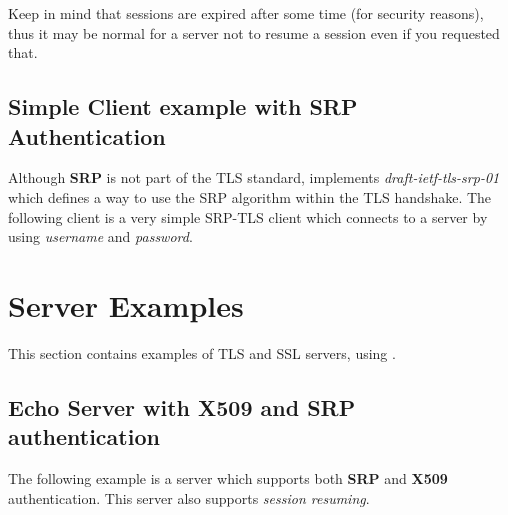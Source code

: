 \documentclass{book}
\begin{document}
\par
Keep in mind that sessions are expired after some time (for security reasons), thus
it may be normal for a server not to resume a session even if you requested that.



\subsection{Simple Client example with SRP Authentication}
Although {\bf SRP} is not part of the TLS standard, \gnutls implements
{\it draft-ietf-tls-srp-01} which defines a way to use the SRP algorithm
within the TLS handshake. The following client
is a very simple SRP-TLS client which connects to a server by using 
{\it username} and {\it password}.



\section{Server Examples}
This section contains examples of TLS and SSL servers, using \gnutls.

\subsection{Echo Server with X509 and SRP authentication}
The following example is a server which supports both {\bf SRP} and {\bf X509} authentication.
This server also supports {\it session resuming}.





\end{document}
